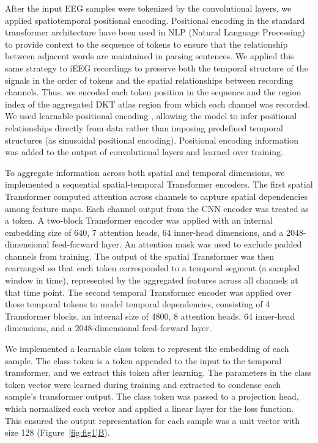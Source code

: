 \documentclass[11pt]{article}
\begin{document}
After the input EEG samples were tokenized by the convolutional layers, we applied spatiotemporal positional encoding. Positional encoding in the standard transformer architecture have been used in NLP (Natural Language Processing) to provide context to the sequence of tokens to ensure that the relationship between adjacent words are maintained in parsing sentences. We applied this same strategy to iEEG recordings to preserve both the temporal structure of the signals in the order of tokens and the spatial relationships between recording channels. Thus, we encoded each token position in the sequence and the region index of the aggregated DKT atlas region from which each channel was recorded. We used learnable positional encoding , allowing the model to infer positional relationships directly from data rather than imposing predefined temporal structures (as sinusoidal positional encoding). Positional encoding information was added to the output of convolutional layers and learned over training.

To aggregate information across both spatial and temporal dimensions, we implemented a sequential spatial-temporal Transformer encoders. The first spatial Transformer computed attention across channels to capture spatial dependencies among feature maps. Each channel output from the CNN encoder was treated as a token. A two-block Transformer encoder was applied with an internal embedding size of 640, 7 attention heads, 64 inner-head dimensions, and a 2048-dimensional feed-forward layer. An attention mask was used to exclude padded channels from training. The output of the spatial Transformer was then rearranged so that each token corresponded to a temporal segment (a sampled window in time), represented by the aggregated features across all channels at that time point. The second temporal Transformer encoder was applied over these temporal tokens to model temporal dependencies, consisting of 4 Transformer blocks, an internal size of 4800, 8 attention heads, 64 inner-head dimensions, and a 2048-dimensional feed-forward layer.

We implemented a learnable class token to represent the embedding of each sample. The class token is a token appended to the input to the temporal transformer, and we extract this token after learning. The parameters in the class token vector were learned during training and extracted to condense each sample’s transformer output. The class token was passed to a projection head, which normalized each vector and applied a linear layer for the loss function. This ensured the output representation for each sample was a unit vector with size 128 (Figure~\hyperref[fig:fig1]{\ref*{fig:fig1}B}).
\end{document}

